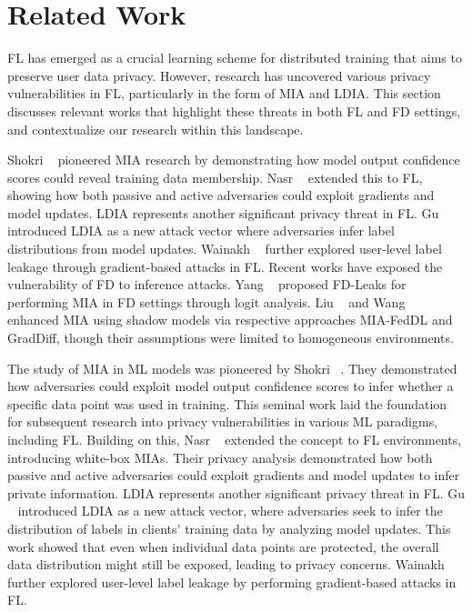 \section{Related Work}
\label{sec:related}
FL has emerged as a crucial learning scheme for distributed training that aims to preserve user data privacy. 
However, research has uncovered various privacy vulnerabilities in FL, particularly in the form of MIA and LDIA.
This section discusses relevant works that highlight these threats in both FL and FD settings, and contextualize our research within this landscape.

Shokri \etal~\cite{shokri2017membership} pioneered MIA research by demonstrating how model output confidence scores could reveal training data membership. 
Nasr \etal~\cite{nasr2019comprehensive} extended this to FL, showing how both passive and active adversaries could exploit gradients and model updates.
LDIA represents another significant privacy threat in FL.
Gu \etal~\cite{gu2023ldia} introduced LDIA as a new attack vector where adversaries infer label distributions from model updates. Wainakh \etal~\cite{wainakh2021user} further explored user-level label leakage through gradient-based attacks in FL.
Recent works have exposed the vulnerability of FD to inference attacks.
Yang \etal~\cite{yang2022fd} proposed FD-Leaks for performing MIA in FD settings through logit analysis. Liu \etal~\cite{liu2023mia} and Wang \etal~\cite{wang2024graddiff} enhanced MIA using shadow models via respective approaches MIA-FedDL and GradDiff, though their assumptions were limited to homogeneous environments.

\iffalse
The study of MIA in ML models was pioneered by Shokri \etal~\cite{shokri2017membership}.
They demonstrated how adversaries could exploit model output confidence scores to infer whether a specific data point was used in training.
This seminal work laid the foundation for subsequent research into privacy vulnerabilities in various ML paradigms, including FL.
Building on this, Nasr \etal~\cite{nasr2019comprehensive} extended the concept to FL environments, introducing white-box MIAs.
Their privacy analysis demonstrated how both passive and active adversaries could exploit gradients and model updates to infer private information.
LDIA represents another significant privacy threat in FL.
Gu \etal~\cite{gu2023ldia} introduced LDIA as a new attack vector, where adversaries seek to infer the distribution of labels in clients' training data by analyzing model updates.
This work showed that even when individual data points are protected, the overall data distribution might still be exposed, leading to privacy concerns.
Wainakh \etal~\cite{wainakh2021user} further explored user-level label leakage by performing gradient-based attacks in FL.

